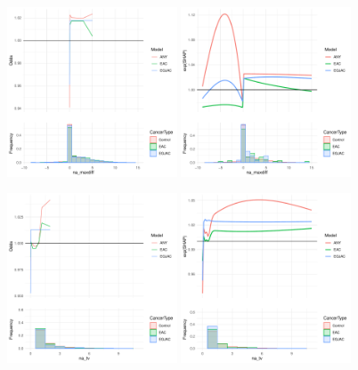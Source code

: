 \documentclass[12pt]{article}
\begin{document}
\begin{figure}[h]
\centering
\includegraphics[width=0.45\textwidth]{pdp/na_maxdiff.pdf}
\includegraphics[width=0.45\textwidth]{shap/na_maxdiff.pdf}
\end{figure}
\begin{figure}[h]
\centering
\includegraphics[width=0.45\textwidth]{pdp/na_tv.pdf}
\includegraphics[width=0.45\textwidth]{shap/na_tv.pdf}
\end{figure}
\end{document}
